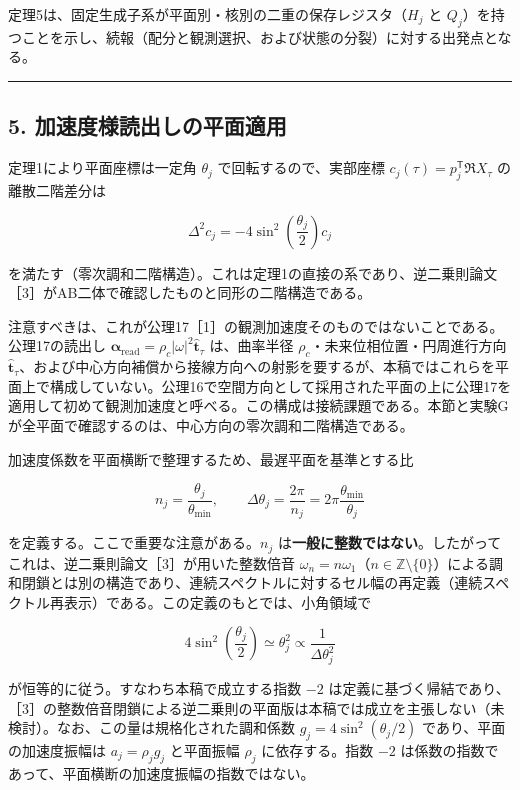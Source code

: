\documentclass[
  a4paper,
]{ltjsarticle}
\begin{document}
定理5は、固定生成子系が平面別・核別の二重の保存レジスタ（\(H_j\) と
\(Q_j\)）を持つことを示し、続報（配分と観測選択、および状態の分裂）に対する出発点となる。

\begin{center}\rule{0.5\linewidth}{0.5pt}\end{center}

\subsection{5.
加速度様読出しの平面適用}\label{ux52a0ux901fux5ea6ux69d8ux8aadux51faux3057ux306eux5e73ux9762ux9069ux7528}

定理1により平面座標は一定角 \(\theta_j\) で回転するので、実部座標
\(c_j(\tau)=p_j^{\mathsf T}\Re X_\tau\) の離散二階差分は

\[
\Delta^2c_j
=-4\sin^2\!\left(\frac{\theta_j}{2}\right)c_j
\]

を満たす（零次調和二階構造）。これは定理1の直接の系であり、逆二乗則論文［3］がAB二体で確認したものと同形の二階構造である。

注意すべきは、これが公理17［1］の観測加速度そのものではないことである。公理17の読出し
\(\boldsymbol\alpha_{\mathrm{read}}=\rho_c\lvert\omega\rvert^2\hat{\boldsymbol t}_\tau\)
は、曲率半径 \(\rho_c\)・未来位相位置・円周進行方向
\(\hat{\boldsymbol t}_\tau\)、および中心方向補償から接線方向への射影を要するが、本稿ではこれらを平面上で構成していない。公理16で空間方向として採用された平面の上に公理17を適用して初めて観測加速度と呼べる。この構成は接続課題である。本節と実験Gが全平面で確認するのは、中心方向の零次調和二階構造である。

加速度係数を平面横断で整理するため、最遅平面を基準とする比

\[
n_j=\frac{\theta_j}{\theta_{\min}},
\qquad
\Delta\theta_j=\frac{2\pi}{n_j}=2\pi\frac{\theta_{\min}}{\theta_j}
\]

を定義する。ここで重要な注意がある。\(n_j\)
は\textbf{一般に整数ではない}。したがってこれは、逆二乗則論文［3］が用いた整数倍音
\(\omega_n=n\omega_1\)（\(n\in\mathbb Z\setminus\{0\}\)）による調和閉鎖とは別の構造であり、連続スペクトルに対するセル幅の再定義（連続スペクトル再表示）である。この定義のもとでは、小角領域で

\[
4\sin^2\!\left(\frac{\theta_j}{2}\right)\simeq\theta_j^2\propto\frac{1}{\Delta\theta_j^2}
\]

が恒等的に従う。すなわち本稿で成立する指数 \(-2\)
は定義に基づく帰結であり、［3］の整数倍音閉鎖による逆二乗則の平面版は本稿では成立を主張しない（未検討）。なお、この量は規格化された調和係数
\(g_j=4\sin^2(\theta_j/2)\) であり、平面の加速度振幅は \(a_j=\rho_jg_j\)
と平面振幅 \(\rho_j\) に依存する。指数 \(-2\)
は係数の指数であって、平面横断の加速度振幅の指数ではない。
\end{document}
